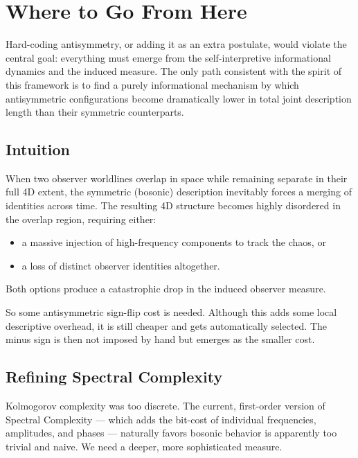 \section{Where to Go From Here}

Hard-coding antisymmetry, or adding it as an extra postulate, would violate the central goal: everything must emerge from the self-interpretive informational dynamics and the induced measure.
The only path consistent with the spirit of this framework is to find a purely informational mechanism by which antisymmetric configurations become dramatically lower in total joint description length
than their symmetric counterparts.

\subsection*{Intuition}

When two observer worldlines overlap in space while remaining separate in their full 4D extent, the symmetric (bosonic) description inevitably forces a merging of identities across time.
The resulting 4D structure becomes highly disordered in the overlap region, requiring either:

\begin{itemize}
  \item a massive injection of high-frequency components to track the chaos, or
  \item a loss of distinct observer identities altogether.
\end{itemize}

Both options produce a catastrophic drop in the induced observer measure.

So some antisymmetric sign-flip cost is needed. Although this adds some local descriptive overhead, it is still cheaper and gets automatically selected.
The minus sign is then not imposed by hand but emerges as the smaller cost.



\subsection*{Refining Spectral Complexity}

Kolmogorov complexity was too discrete. The current, first-order version of Spectral Complexity — which adds the bit-cost of individual frequencies, amplitudes, and phases — naturally favors bosonic behavior is apparently
too trivial and naive. We need a deeper, more sophisticated measure.

